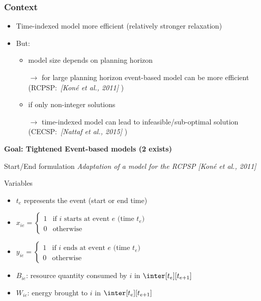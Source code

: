 
\begin{frame}
  \frametitle{Context}
  \begin{itemize}
  \item Time-indexed model more efficient {\small (relatively stronger relaxation)}
    \pause
    \vfill
  \item But:
    \begin{itemize}
    \item  model size depends on planning horizon 
      
      $\longrightarrow $ for large planning horizon event-based model can be more
      efficient (RCPSP:~{\color{gray!50!black!70}\it [Koné et al.,
        2011]} )
      \vfill
      \pause
    \item  if only non-integer solutions
      
      $\longrightarrow$ time-indexed model can lead to
      infeasible/sub-optimal solution
      (CECSP:~{\color{gray!50!black!70}\it [Nattaf et al., 2015]} )
    \end{itemize}
  \end{itemize}
  \vfill
  \pause
  {\bf Goal: Tightened Event-based models (2 exists)} 
\end{frame}
\begin{frame}{Start/End formulation}
  {\small \it Adaptation of a model for the RCPSP {\color{gray!50!black!50} \it [Koné et al., 2011]}}
  \vfill
  \begin{block}{Variables}
    \begin{itemize}
    \item  $t_e$ represents the event (start or end time)
      \pause
      \vspace{0.3cm}
    \item $x_{ie}=\left\{
        \begin{array}{ll}
          1 & \text{if $i$ starts at event $e$ (time $t_e$)}\\
          0 & \text{otherwise}
        \end{array}
      \right.
      $
      \pause
      \vspace{0.3cm}
    \item $y_{ie}=\left\{
        \begin{array}{ll}
          1 & \text{if $i$ ends at event $e$ (time $t_e$)}\\
          0 & \text{otherwise}
        \end{array}
      \right.
      $
      \vspace{0.3cm}
      \pause
    \item $B_{ie}$: resource quantity consumed by $i$ in $\inter[t_e][t_{e+1}]$
      \vspace{0.3cm}
      \pause
    \item $W_{ie}$: energy brought to $i$ in $\inter[t_e][t_{e+1}]$   
    \end{itemize}
  \end{block}
\end{frame}


